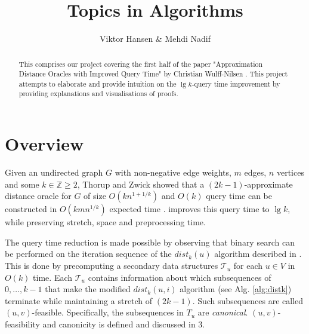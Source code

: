 \documentclass[12pt]{article}
\begin{document}
\nocite{*}


\title{Topics in Algorithms}

\author{Viktor Hansen \& Mehdi Nadif}

\maketitle

\begin{abstract}
  This comprises our project covering the first half of the paper "Approximation Distance Oracles with Improved Query Time" by Christian Wulff-Nilsen \cite{Wulff2013}. This project attempts to elaborate and provide intuition on the $\lg k$-query time improvement by providing explanations and visualisations of proofs.
\end{abstract}

\pagebreak

\section{Overview}
Given an undirected graph $G$ with non-negative edge weights, $m$ edges, $n$ vertices and some $k \in \mathbb{Z} \geq 2$, Thorup and Zwick showed that a $(2k-1)$-approximate distance oracle for $G$ of size $O(kn^{1+1/k})$ and $O(k)$ query time can be constructed in $O(kmn^{1/k})$ expected time \cite{Thorup2005}. \cite{Wulff2013} improves this query time to $\lg k$, while preserving stretch, space and preprocessing time. %

The query time reduction is made possible by observing that binary search can be performed on the iteration sequence of the $dist_k(u)$ algorithm described in \cite{Thorup2005}. This is done by precomputing a secondary data structures $\mathcal{T}_u$ for each $u \in V$ in $O(k)$ time. Each $\mathcal{T}_u$ contains information about which subsequences of $0, \hdots, k-1$ that make the modified $dist_k(u,i)$ algorithm (see Alg. \ref{alg:distk}) terminate while maintaining a  stretch of $(2k-1)$. Such subsequences are called $(u,v)$-feasible. Specifically, the subsequences in $T_u$ are \textit{canonical}. $(u,v)$-feasibility and canonicity is defined and discussed in 3.

\end{document}

